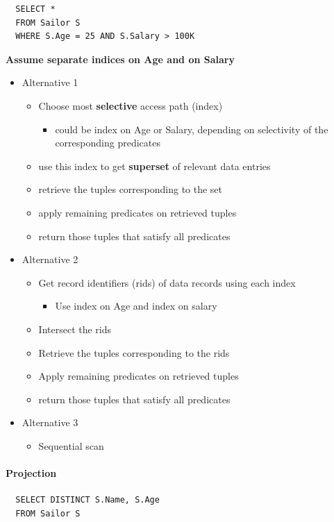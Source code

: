\begin{lstlisting}
  SELECT *
  FROM Sailor S
  WHERE S.Age = 25 AND S.Salary > 100K
\end{lstlisting}

\textbf{Assume separate indices on Age and on Salary}

\begin{itemize}
\item Alternative 1
  \begin{itemize}
  \item Choose most \textbf{selective} access path (index)
    \begin{itemize}
    \item could be index on Age or Salary, depending on selectivity
      of the corresponding predicates
    \end{itemize}
  \item use this index to get \textbf{superset} of relevant data entries
  \item retrieve the tuples corresponding to the set
  \item apply remaining predicates on retrieved tuples
  \item return those tuples that satisfy all predicates
  \end{itemize}

\item Alternative 2
  \begin{itemize}
  \item Get record identifiers (rids) of data records using each index
    \begin{itemize}
    \item Use index on Age and index on salary
    \end{itemize}
  \item Intersect the rids
  \item Retrieve the tuples corresponding to the rids
  \item Apply remaining predicates on retrieved tuples
  \item return those tuples that satisfy all predicates
  \end{itemize}

\item Alternative 3
  \begin{itemize}
  \item Sequential scan
  \end{itemize}
\end{itemize}


\paragraph{Projection}
\begin{lstlisting}
  SELECT DISTINCT S.Name, S.Age
  FROM Sailor S
\end{lstlisting}

